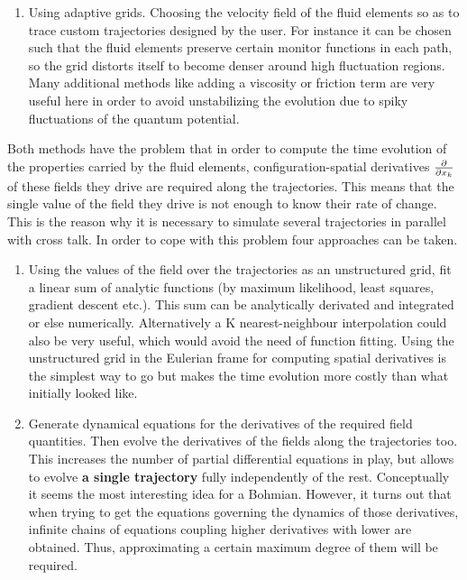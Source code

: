 \documentclass[11pt, a4paper]{article} %
\begin{document}
\begin{enumerate}
\begin{enumerate}
\item Using adaptive grids. Choosing the velocity field of the fluid elements so as to trace custom trajectories designed by the user. For instance it can be chosen such that the fluid elements preserve certain monitor functions in each path, so the grid distorts itself to become denser around high fluctuation regions. Many additional methods like adding a viscosity or friction term are very useful here in order to avoid unstabilizing the evolution due to spiky fluctuations of the quantum potential.
\end{enumerate}

Both methods have the problem that in order to compute the time evolution of the properties carried by the fluid elements, configuration-spatial derivatives $\pdv{}{x_k}$ of these fields they drive are required along the trajectories. This means that the single value of the field they drive is not enough to know their rate of change. This is the reason why it is necessary to simulate several trajectories in parallel with cross talk. In order to cope with this problem four approaches can be taken.

\begin{enumerate}
\item Using the values of the field over the trajectories as an unstructured grid, fit a linear sum of analytic functions (by maximum likelihood, least squares, gradient descent etc.). This sum can be analytically derivated and integrated or else numerically. Alternatively a K nearest-neighbour interpolation could also be very useful, which would avoid the need of function fitting. Using the unstructured grid in the Eulerian frame for computing spatial derivatives is the simplest way to go but makes the time evolution more costly than what initially looked like.

\item Generate dynamical equations for the derivatives of the required field quantities. Then evolve the derivatives of the fields along the trajectories too. This increases the number of partial differential equations in play, but allows to evolve {\bf a single trajectory} fully independently of the rest. Conceptually it seems the most interesting idea for a Bohmian. However, it turns out that when trying to get the equations governing the dynamics of those derivatives, infinite chains of equations coupling higher derivatives with lower are obtained. Thus, approximating a certain maximum degree of them will be required.


\end{enumerate}
\end{enumerate}
\end{document}
